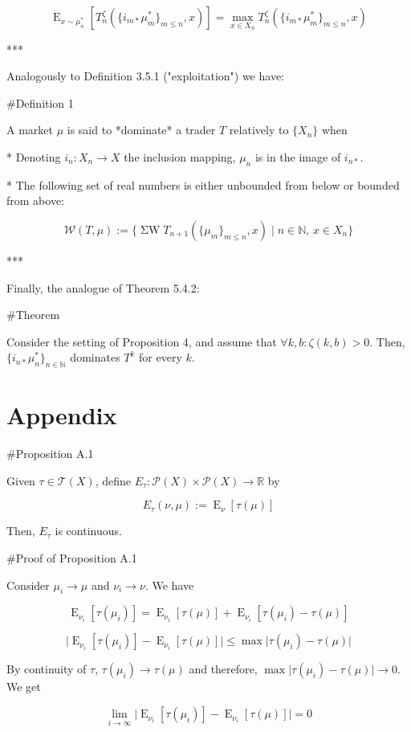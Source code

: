 \documentclass[a4paper]{article}
\DeclareMathOperator{\E}{E}
\newcommand{\Nats}{\mathbb{N}}
\newcommand{\Reals}{\mathbb{R}}
\newcommand{\Abs}[1]{\lvert #1 \rvert}
\newcommand{\Prob}{\mathcal{P}}
\newcommand{\T}{\mathcal{T}(X)}
\newcommand{\SW}{\operatorname{\Sigma W}}
\newcommand{\Wo}{\mathcal{W}}
\begin{document}
$$\E_{x \sim \mu^*_n}[T^\zeta_n(\{i_{m*}\mu^*_m\}_{m \leq n},x)] = \max_{x \in X_n} T^\zeta_n(\{i_{m*}\mu^*_m\}_{m \leq n},x)$$

***

Analogously to Definition 3.5.1 ("exploitation") we have:

\#Definition 1

A market ${\mu}$ is said to *dominate* a trader ${T}$ relatively to ${\{X_n\}}$ when

* Denoting ${i_n: X_n \rightarrow X}$ the inclusion mapping, ${\mu_n}$ is in the image of ${i_{n*}}$.

* The following set of real numbers is either unbounded from below or bounded from above:

$$\Wo(T,\mu):=\{\SW T_{n+1}(\{\mu_m\}_{m \leq n},x) \mid n \in \Nats,\, x \in X_n\}$$

***

Finally, the analogue of Theorem 5.4.2:

\#Theorem

Consider the setting of Proposition 4, and assume that ${\forall k,b: \zeta(k,b) > 0}$.  Then, ${\{i_{n*}\mu^*_n\}_{n \in \Nats}}$ dominates ${T^k}$ for every ${k}$.

\section{Appendix}

\#Proposition A.1

Given ${\tau \in \T}$, define ${E_\tau: \Prob(X) \times \Prob(X) \rightarrow \Reals}$ by

$$E_\tau(\nu,\mu):=\E_\nu[\tau(\mu)]$$

Then, ${E_\tau}$ is continuous.

\#Proof of Proposition A.1

Consider ${\mu_i \rightarrow \mu}$ and ${\nu_i \rightarrow \nu}$. We have

$$\E_{\nu_i}[\tau(\mu_i)] = \E_{\nu_i}[\tau(\mu)] + \E_{\nu_i}[\tau(\mu_i) - \tau(\mu)]$$

$$\Abs{\E_{\nu_i}[\tau(\mu_i)] - \E_{\nu_i}[\tau(\mu)]} \leq \max\Abs{\tau(\mu_i) - \tau(\mu)}$$

By continuity of ${\tau}$, ${\tau(\mu_i) \rightarrow \tau(\mu)}$ and therefore, $\max\Abs{\tau(\mu_i) - \tau(\mu)} \rightarrow 0$. We get

$$\lim_{i \rightarrow \infty} \Abs{\E_{\nu_i}[\tau(\mu_i)] - \E_{\nu_i}[\tau(\mu)]} = 0$$
\end{document}
